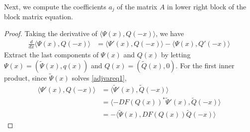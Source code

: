 \documentclass[thesis.tex]{subfiles}
\begin{document}
Next, we compute the coefficients $a_j$ of the matrix $A$ in lower right block of the block matrix equation.

\begin{lemma}

\begin{proof}
Taking the derivative of $\langle \Psi(x), Q(-x) \rangle$, we have
\begin{align*}
\frac{d}{dx} \langle \Psi(x), Q(-x) \rangle
&= \langle \Psi'(x), Q(-x) \rangle - \langle \Psi(x), Q'(-x) \rangle
\end{align*}
Extract the last components of $\Psi(x)$ and $Q(x)$ by letting $\Psi(x) = (\tilde{\Psi}(x), q(x))$ and $Q(x) = (\tilde{Q}(x), 0)$. For the first inner product, since $\tilde{\Psi}(x)$ solves \cref{adjvareq1},
\begin{align*}
\langle \Psi'(x), Q(-x) \rangle &= \langle \tilde{\Psi}'(x), \tilde{Q}(-x) \rangle \\
&= \langle -DF(Q(x))^* \tilde{\Psi}'(x), \tilde{Q}(-x) \rangle \\
&= - \langle \tilde{\Psi}(x), DF(Q(x)) \tilde{Q}(-x) \rangle 
\end{align*}
\end{proof}
\end{lemma}
\end{document}
